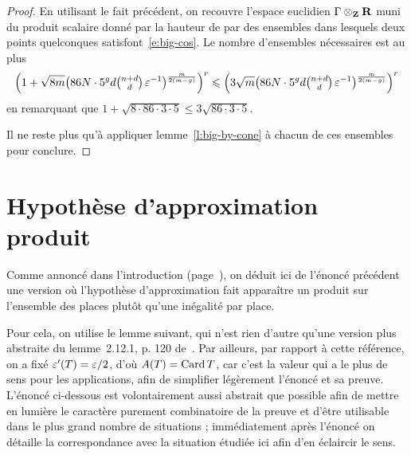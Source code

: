 \begin{proof}
  En utilisant le fait précédent, on recouvre l'espace euclidien \( \Gamma
    \otimes_{\mathbf{Z}} {\mathbf{R}} \) muni du produit scalaire donné par la hauteur de \NT par
  des ensembles dans lesquels deux points quelconques
  satisfont~\eqref{e:big-cos}. Le nombre d'ensembles nécessaires est au plus
  \begin{equation}
    \left(
      1 + \sqrt{8 m}
      \bigl(
        86 N \cdot 5^g d {\textstyle\binom{n + d}{d}}
        \, \varepsilon^{-1}
        \bigr)^{ \frac{m}{2(m-g)} }
    \right)^r
    \leqslant
    \left(
      3 \sqrt{m}
      \bigl(
        86 N \cdot 5^g d {\textstyle\binom{n + d}{d}}
        \, \varepsilon^{-1}
        \bigr)^{ \frac{m}{2(m-g)} }
    \right)^r
  \end{equation}
  en remarquant que \( 1 + \sqrt{ 8 \cdot 86 \cdot 3 \cdot 5 } \le 3 \sqrt{ 86
      \cdot 3 \cdot 5 } \).

  Il ne reste plus qu'à appliquer lemme~\vref{l:big-by-cone} à chacun de ces
  ensembles pour conclure.
\end{proof}



\section{Hypothèse d'approximation produit}
\label{sec:ha-prod}

Comme annoncé dans l'introduction (page~\pageref{e:ha-prod}), on déduit ici de
l'énoncé précédent une version où l'hypothèse d'approximation fait apparaître
un produit sur l'ensemble des places plutôt qu'une inégalité par place.

Pour cela, on utilise le lemme suivant, qui n'est rien d'autre qu'une version
plus abstraite du lemme~2.12.1, p. 120 de~\cite{farhith}. Par ailleurs, par
rapport à cette référence, on a fixé \( \varepsilon'(T) = \varepsilon/2 \), d'où \( A(T) =
  \operatorname{Card} T \), car c'est la valeur qui a le plus de sens pour les applications,
afin de simplifier légèrement l'énoncé et sa preuve. L'énoncé ci-dessous est
volontairement aussi abstrait que possible afin de mettre en lumière le
caractère purement combinatoire de la preuve et d'être utilisable dans le plus
grand nombre de situations ; immédiatement après l'énoncé on détaille la
correspondance avec la situation étudiée ici afin d'en éclaircir le sens.

